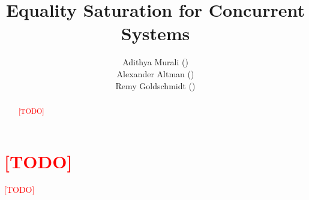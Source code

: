 \documentclass[american,extrafontsizes,12pt,portrait,letterpaper,oneside,onecolumn,article,final,fleqn]{memoir}
\author{Adithya Murali (\email{adithya5@illinois.edu})\\Alexander Altman (\email{altman3@illinois.edu})\\Remy Goldschmidt (\email{regolds2@illinois.edu})}
\title{Equality Saturation for Concurrent Systems}
\date{}
\newcommand*\TODO{\textcolor{red}{[TODO]}\xspace}
\begin{document}
\checkandfixthelayout[nearest]
\midsloppy

\maketitle

\begin{abstract}
\TODO
\end{abstract}

\chapter{\TODO}

\TODO
\end{document}
